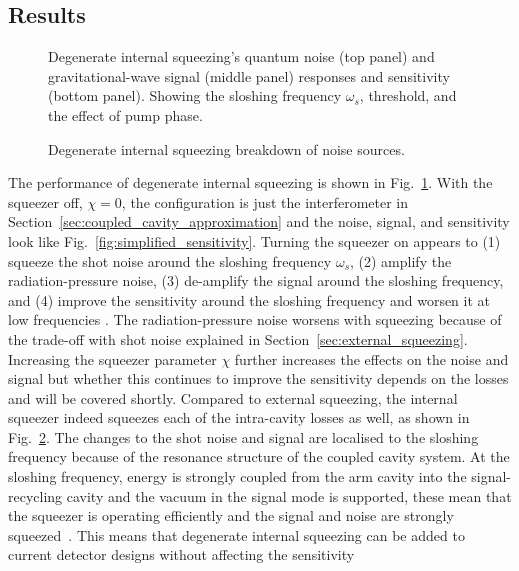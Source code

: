 \subsection{Results}


\begin{figure}
	\centering
	\caption{Degenerate internal squeezing's quantum noise (top panel) and gravitational-wave signal (middle panel) responses and sensitivity (bottom panel). Showing the sloshing frequency $\omega_s$, threshold, and the effect of pump phase. }
	\label{fig:dIS_sensitivity}
\end{figure}

\begin{figure}
	\centering
	\caption{Degenerate internal squeezing breakdown of noise sources.}
	\label{fig:dIS_noise_budget}
\end{figure}

The performance of degenerate internal squeezing is shown in Fig.~\ref{fig:dIS_sensitivity}. With the squeezer off, $\chi=0$, the configuration is just the interferometer in Section~\ref{sec:coupled_cavity_approximation} and the noise, signal, and sensitivity look like Fig.~\ref{fig:simplified_sensitivity}. Turning the squeezer on appears to (1) squeeze the shot noise around the sloshing frequency $\omega_s$, (2) amplify the radiation-pressure noise, (3) de-amplify the signal around the sloshing frequency, and (4) improve the sensitivity around the sloshing frequency and worsen it at low frequencies . The radiation-pressure noise worsens with squeezing  because of the trade-off with shot noise explained in Section~\ref{sec:external_squeezing}. Increasing the squeezer parameter $\chi$ further increases the effects on the noise and signal but whether this continues to improve the sensitivity depends on the losses and will be covered shortly. Compared to external squeezing, the internal squeezer indeed squeezes each of the intra-cavity losses as well, as shown in Fig.~\ref{fig:dIS_noise_budget}. 
The changes to the shot noise and signal are localised to the sloshing frequency because of the resonance structure of the coupled cavity system. At the sloshing frequency, energy is strongly coupled from the arm cavity into the signal-recycling cavity and the vacuum in the signal mode is supported, these mean that the squeezer is operating efficiently and the signal and noise are strongly squeezed~\cite{}.  This means that degenerate internal squeezing can be added to current detector designs without affecting the sensitivity 

